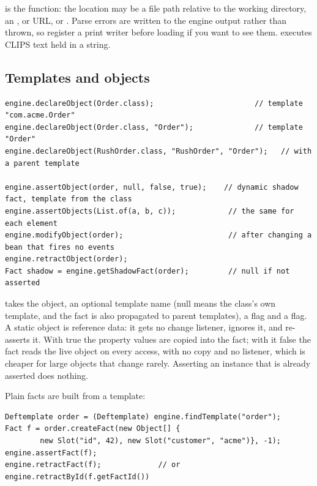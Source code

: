  is the  function: the location may be a file
path relative to the working directory, an ,  or
 URL, or . Parse errors are written to
the engine output rather than thrown, so register a print writer before
loading if you want to see them.  executes CLIPS text held in
a string.

\subsection{Templates and objects}

\begin{lstlisting}[style=java]
engine.declareObject(Order.class);                       // template "com.acme.Order"
engine.declareObject(Order.class, "Order");              // template "Order"
engine.declareObject(RushOrder.class, "RushOrder", "Order");   // with a parent template

engine.assertObject(order, null, false, true);    // dynamic shadow fact, template from the class
engine.assertObjects(List.of(a, b, c));            // the same for each element
engine.modifyObject(order);                        // after changing a bean that fires no events
engine.retractObject(order);
Fact shadow = engine.getShadowFact(order);         // null if not asserted
\end{lstlisting}

 takes the object, an optional template name (null
means the class's own template, and the fact is also propagated to
parent templates), a  flag and a  flag. A static
object is reference data: it gets no change listener,
 ignores it, and  re-asserts it. With
 true the property values are copied into the fact; with it
false the fact reads the live object on every access, with no copy and
no listener, which is cheaper for large objects that change rarely.
Asserting an instance that is already asserted does nothing.

Plain facts are built from a template:

\begin{lstlisting}[style=java]
Deftemplate order = (Deftemplate) engine.findTemplate("order");
Fact f = order.createFact(new Object[] {
        new Slot("id", 42), new Slot("customer", "acme")}, -1);
engine.assertFact(f);
engine.retractFact(f);             // or engine.retractById(f.getFactId())
\end{lstlisting}

